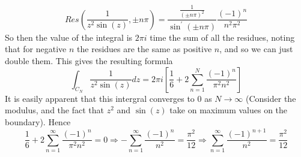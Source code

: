 \documentclass{article}
\begin{document}
\[
	Res(\frac{1}{z^2\sin(z)}, \pm n\pi) = \frac{\frac{1}{(\pm n\pi)^2}}{\sin^\prime(\pm n \pi)} \frac{(-1)^n}{n^2\pi^2}
\]
So then the value of the integral is $2\pi i$ time the sum of all the residues, noting that for negative $n$ the residues are the same as positive $n$, and so we can just double them.  This gives the resulting formula
\[
	\int_{C_N} \frac{1}{z^2\sin(z)} dz = 2\pi i \left[ \frac{1}{6} + 2 \sum_{n=1}^N \frac{(-1)^n}{\pi^2n^2} \right]
\]
It is easily apparent that this intergral converges to $0$ as $N \to \infty$ (Consider the modulus, and the fact that $z^2$ and $\sin(z)$ take on maximum values on the boundary).  Hence
\[
	 \frac{1}{6} + 2 \sum_{n=1}^\infty \frac{(-1)^n}{\pi^2n^2} = 0 \Rightarrow -\sum_{n=1}^\infty \frac{(-1)^n}{n^2} = \frac{\pi^2}{12} \Rightarrow  \sum_{n=1}^\infty \frac{(-1)^{n+1}}{n^2} = \frac{\pi^2}{12} 
\]
\end{document}
